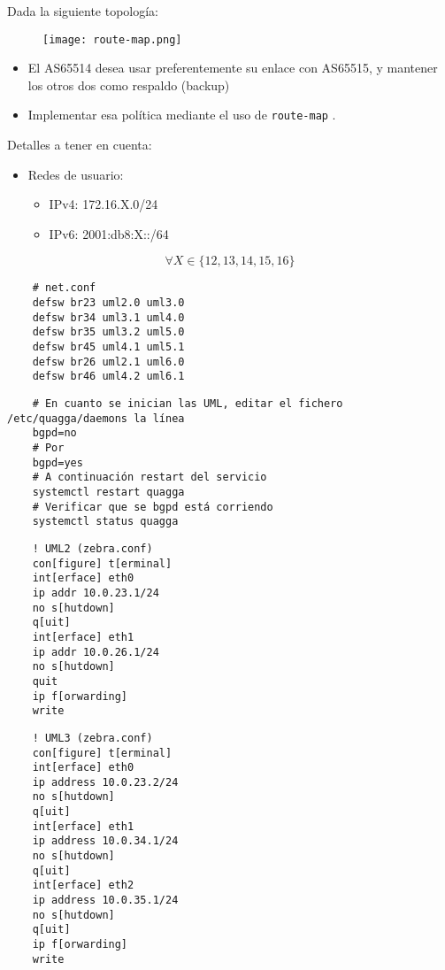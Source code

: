 Dada la siguiente topología:
  \begin{figure}[h]
    \texttt{[image: route-map.png]}
  \end{figure}

  \begin{itemize}
    \item El AS65514 desea usar preferentemente su enlace con AS65515,
    y mantener los otros dos como respaldo (backup)
    \item Implementar esa política mediante el uso de \texttt{route-map} .
  \end{itemize}

  Detalles a tener en cuenta:

  \begin{itemize}
    \item Redes de usuario:
    \begin{itemize}
      \item IPv4: 172.16.X.0/24
      \item IPv6: 2001:db8:X::/64
    \end{itemize}
  \end{itemize}

  \[ \forall X \in \{12,13,14,15,16\} \]
  
  
  \begin{verbatim}
    # net.conf
    defsw br23 uml2.0 uml3.0
    defsw br34 uml3.1 uml4.0
    defsw br35 uml3.2 uml5.0
    defsw br45 uml4.1 uml5.1
    defsw br26 uml2.1 uml6.0
    defsw br46 uml4.2 uml6.1
  \end{verbatim}
  
  \begin{verbatim}
    # En cuanto se inician las UML, editar el fichero /etc/quagga/daemons la línea
    bgpd=no
    # Por
    bgpd=yes
    # A continuación restart del servicio
    systemctl restart quagga
    # Verificar que se bgpd está corriendo
    systemctl status quagga
  \end{verbatim}
  
  \begin{verbatim}
    ! UML2 (zebra.conf)
    con[figure] t[erminal]
    int[erface] eth0
    ip addr 10.0.23.1/24
    no s[hutdown]
    q[uit]
    int[erface] eth1
    ip addr 10.0.26.1/24
    no s[hutdown]
    quit
    ip f[orwarding]
    write
  \end{verbatim}
  
  \begin{verbatim}
    ! UML3 (zebra.conf)
    con[figure] t[erminal]
    int[erface] eth0
    ip address 10.0.23.2/24
    no s[hutdown]
    q[uit]
    int[erface] eth1
    ip address 10.0.34.1/24
    no s[hutdown]
    q[uit]
    int[erface] eth2
    ip address 10.0.35.1/24
    no s[hutdown]
    q[uit]
    ip f[orwarding]
    write
  \end{verbatim}
  
